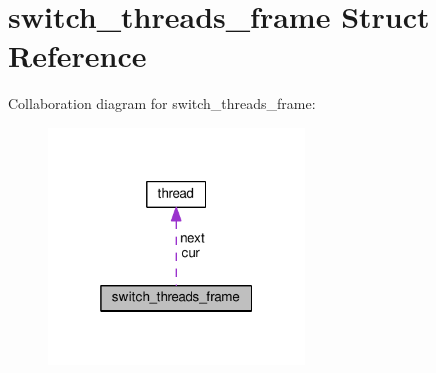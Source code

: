 \hypertarget{structswitch__threads__frame}{}\section{switch\+\_\+threads\+\_\+frame Struct Reference}
\label{structswitch__threads__frame}


Collaboration diagram for switch\+\_\+threads\+\_\+frame\+:
\nopagebreak
\begin{figure}[H]
\begin{center}
\leavevmode
\includegraphics[width=193pt]{structswitch__threads__frame__coll__graph}
\end{center}
\end{figure}
